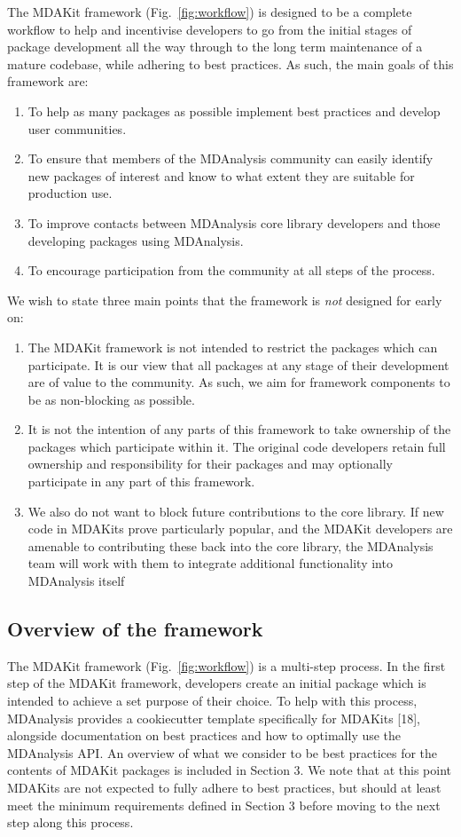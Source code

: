 \documentclass{article}
\begin{document}
The MDAKit framework (Fig.~\ref{fig:workflow}) is designed to be a complete workflow to help and incentivise developers to go from the initial stages of package development all the way through to the long term maintenance of a mature codebase, while adhering to best practices. As such, the main goals of this framework are:
\begin{enumerate}
    \item To help as many packages as possible implement best practices and develop user communities.
    \item To ensure that members of the MDAnalysis community can easily identify new packages of interest and know to what extent they are suitable for production use.
    \item To improve contacts between MDAnalysis core library developers and those developing packages using MDAnalysis.
    \item To encourage participation from the community at all steps of the process.
\end{enumerate}
We wish to state three main points that the framework is \emph{not} designed for early on:
\begin{enumerate}
    \item The MDAKit framework is not intended to restrict the packages which can participate. It is our view that all packages at any stage of their development are of value to the community. As such, we aim for framework components to be as non-blocking as possible.
    \item It is not the intention of any parts of this framework to take ownership of the packages which participate within it. The original code developers retain full ownership and responsibility for their packages and may optionally participate in any part of this framework.
    \item We also do not want to block future contributions to the core library. If new code in MDAKits prove particularly popular, and the MDAKit developers are amenable to contributing these back into the core library, the MDAnalysis team will work with them to integrate additional functionality into MDAnalysis itself
\end{enumerate}

\subsection{Overview of the framework}

The MDAKit framework (Fig.~\ref{fig:workflow}) is a multi-step process. In the first step of the MDAKit framework, developers create an initial package which is intended to achieve a set purpose of their choice. To help with this process, MDAnalysis provides a cookiecutter template specifically for MDAKits [18], alongside documentation on best practices and how to optimally use the MDAnalysis API. An overview of what we consider to be best practices for the contents of MDAKit packages is included in Section 3. We note that at this point MDAKits are not expected to fully adhere to best practices, but should at least meet the minimum requirements defined in Section 3 before moving to the next step along this process.
\end{document}
